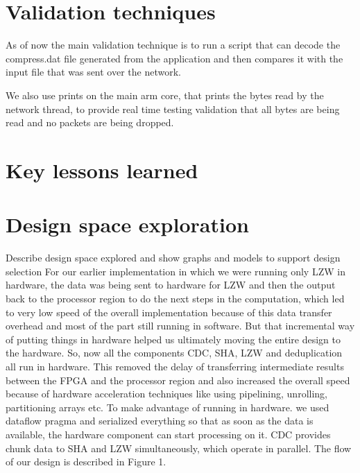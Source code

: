 \documentclass{article}
\begin{document}
\section{Validation techniques}
As of now the main validation technique is to run a script that can decode the compress.dat file generated from the application and then compares it with the input file that was sent over the network. 

We also use prints on the main arm core, that prints the bytes read by the network thread, to provide real time testing validation that all bytes are being read and no packets are being dropped. 
\section{Key lessons learned}

\section{Design space exploration}

Describe design space explored and show graphs and models to support design selection
For our earlier implementation in which we were running only LZW in hardware, the data was being sent to hardware for LZW and then the output back to the processor region to do the next steps in the computation, which led to very low speed of the overall implementation because of this data transfer overhead and most of the part still running in software. 
\newline
But that incremental way of putting things in hardware helped us ultimately moving the entire design to the hardware. So, now all the components CDC, SHA, LZW and deduplication all run in hardware. This removed the delay of transferring intermediate results between the FPGA and the processor region and also increased the overall speed because of hardware acceleration techniques like using pipelining, unrolling, partitioning arrays etc.
\newline\newline
To make advantage of running in hardware. we used dataflow pragma and serialized everything so that as soon as the data is available, the hardware component can start processing on it. 
\newline
CDC provides chunk data to SHA and LZW simultaneously, which operate in parallel. The flow of our design is described in Figure 1.
\newline\newline
\end{document}
